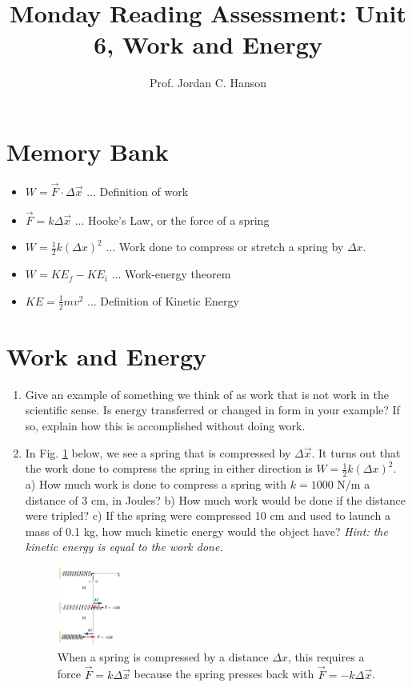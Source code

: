 \documentclass{article}
\begin{document}
\title{Monday Reading Assessment: Unit 6, Work and Energy}
\author{Prof. Jordan C. Hanson}

\maketitle

\section{Memory Bank}

\begin{itemize}
\item $W = \vec{F} \cdot \Delta \vec{x}$ ... Definition of work
\item $\vec{F} = k\Delta \vec{x}$ ... Hooke's Law, or the force of a spring
\item $W = \frac{1}{2}k(\Delta x)^2$ ... Work done to compress or stretch a spring by $\Delta x$.
\item $W = KE_f - KE_i$ ... Work-energy theorem
\item $KE = \frac{1}{2}m v^2$ ... Definition of Kinetic Energy
\end{itemize}

\section{Work and Energy}

\begin{enumerate}
\item Give an example of something we think of as work that is not work in the scientific sense. Is energy transferred or changed in form in your example? If so, explain how this is accomplished without doing work. \\ \vspace{2cm}
\item In Fig. \ref{fig:work} below, we see a spring that is compressed by $\Delta \vec{x}$.  It turns out that the work done to compress the spring in either direction is $W = \frac{1}{2} k (\Delta x)^2$.  a) How much work is done to compress a spring with $k = 1000$ N/m a distance of 3 cm, in Joules?  b) How much work would be done if the distance were tripled?  c) If the spring were compressed 10 cm and used to launch a mass of 0.1 kg, how much kinetic energy would the object have? \textit{Hint: the kinetic energy is equal to the work done.}\\ \vspace{2cm}
\begin{figure}
\centering
\includegraphics[width=0.2\textwidth]{springWork.png}
\caption{\label{fig:work} When a spring is compressed by a distance $\Delta x$, this requires a force $\vec{F} = k\Delta \vec{x}$ because the spring presses back with $\vec{F} = -k\Delta \vec{x}$.}
\end{figure}
\end{enumerate}
\end{document}
